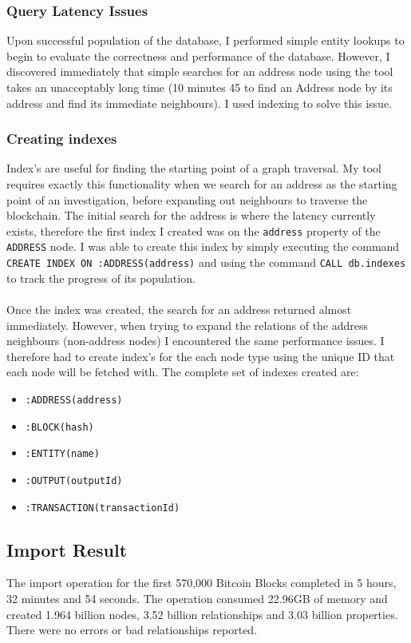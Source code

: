 \subsubsection{Query Latency Issues} 
Upon successful population of the database, I performed simple entity lookups to begin to evaluate the correctness and performance of the database. However, I discovered immediately that simple searches for an address node using the tool takes an unacceptably long time (10 minutes 45 to find an Address node by its address and find its immediate neighbours). I used indexing to solve this issue. 

\subsubsection{Creating indexes}
Index's are useful for finding the starting point of a graph traversal. My tool requires exactly this functionality when we search for an address as the starting point of an investigation, before expanding out neighbours to traverse the blockchain. The initial search for the address is where the latency currently exists, therefore the first index I created was on the \texttt{address} property of the \texttt{ADDRESS} node. I was able to create this index by simply executing the command \texttt{CREATE INDEX ON :ADDRESS(address)} and using the command \texttt{CALL db.indexes} to track the progress of its population. 
\\\\
Once the index was created, the search for an address returned almost immediately. However, when trying to expand the relations of the address neighbours (non-address nodes) I encountered the same performance issues. I therefore had to create index's for the each node type using the unique ID that each node will be fetched with. The complete set of indexes created are:
\begin{itemize}
    \item \texttt{:ADDRESS(address)}
    \item \texttt{:BLOCK(hash)}
    \item \texttt{:ENTITY(name)}
    \item \texttt{:OUTPUT(outputId)}
    \item \texttt{:TRANSACTION(transactionId)}
\end{itemize}

\subsection{Import Result}
The import operation for the first 570,000 Bitcoin Blocks completed in 5 hours, 32 minutes and 54 seconds. The operation consumed 22.96GB of memory and created 1.964 billion nodes, 3.52 billion relationships and 3.03 billion properties. There were no errors or bad relationships reported. 